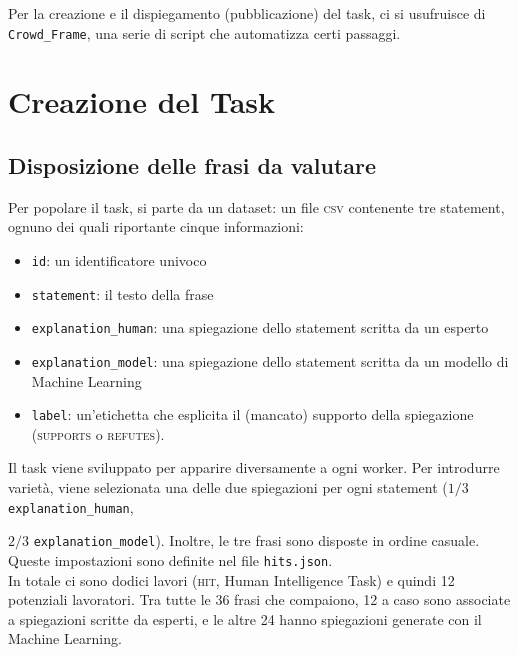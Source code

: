 \documentclass[a4paper, 11pt, twoside]{article}
\begin{document}
Per la creazione e il dispiegamento (pubblicazione) del task, ci si usufruisce di \texttt{Crowd\_Frame}, una serie di script che automatizza certi passaggi.

\section{Creazione del Task}
\subsection{Disposizione delle frasi da valutare}
Per popolare il task, si parte da un dataset: un file \textsc{csv} contenente tre statement, ognuno dei quali riportante cinque informazioni:
\begin{itemize}
    \item \texttt{id}: un identificatore univoco
    \item \texttt{statement}: il testo della frase
    \item \texttt{explanation\_human}: una spiegazione dello statement scritta da un esperto
    \item \texttt{explanation\_model}: una spiegazione dello statement scritta da un modello di Machine Learning
    \item \texttt{label}: un'etichetta che esplicita il (mancato) supporto della spiegazione (\textsc{supports} o \textsc{refutes}).
\end{itemize}

Il task viene sviluppato per apparire diversamente a ogni worker. Per introdurre varietà, viene selezionata una delle due spiegazioni per ogni statement ($1/3$ \texttt{explanation\_human},

$2/3$ \texttt{explanation\_model}). Inoltre, le tre frasi sono disposte in ordine casuale. Queste impostazioni sono definite nel file \texttt{hits.json}. \\

In totale ci sono dodici lavori (\textsc{hit}, Human Intelligence Task) e quindi 12 potenziali lavoratori. Tra tutte le 36 frasi che compaiono, 12 a caso sono associate a spiegazioni scritte da esperti, e le altre 24 hanno spiegazioni generate con il Machine Learning. \\
\end{document}
